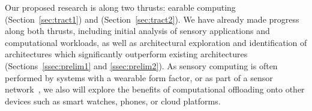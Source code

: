 Our proposed research is along two thrusts: earable computing (Section~\ref{sec:tract1})
and \olfc{} (Section~\ref{sec:tract2}).
We have already made progress along both thrusts, including initial analysis
of sensory applications and computational workloads, as well as architectural
exploration and identification of architectures which significantly outperform
existing architectures (Sections~\ref{ssec:prelim1} and \ref{ssec:prelim2}).
As sensory computing is often performed by systems with a wearable form factor,
or as part of a sensor network~\cite{}, we also will explore the benefits
of computational offloading onto other devices such as smart watches, phones,
or cloud platforms.
